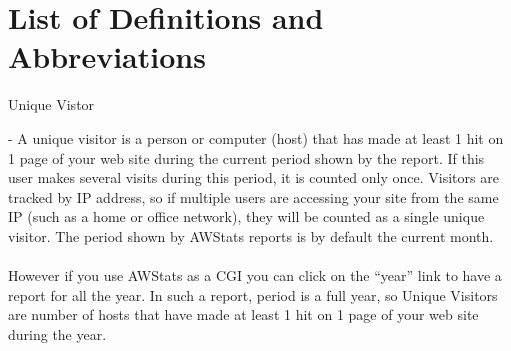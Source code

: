 
\newpage
\setcounter{secnumdepth}{0}
\section{List of Definitions and Abbreviations}
\noindent\begin{itemize*}
  \item{\begin{bf}Unique Vistor\end{bf}} - A unique visitor is a person
or computer (host) that has made at least 1 hit on 1 page of your web
site during the current period shown by the report. If this user makes
several visits during this period, it is counted only once.  Visitors
are tracked by IP address, so if multiple users are accessing your site
 from the same IP (such as a home or office network), they will be 
counted as a single unique visitor. The period shown by AWStats reports
 is by default the current month.\\
\\
However if you use AWStats as a CGI you can click on the ``year'' link to
have a report for all the year. In such a report, period is a full year,
so Unique Visitors are number of hosts that have made at least 1 hit on
1 page of your web site during the year.
\end{itemize*}

